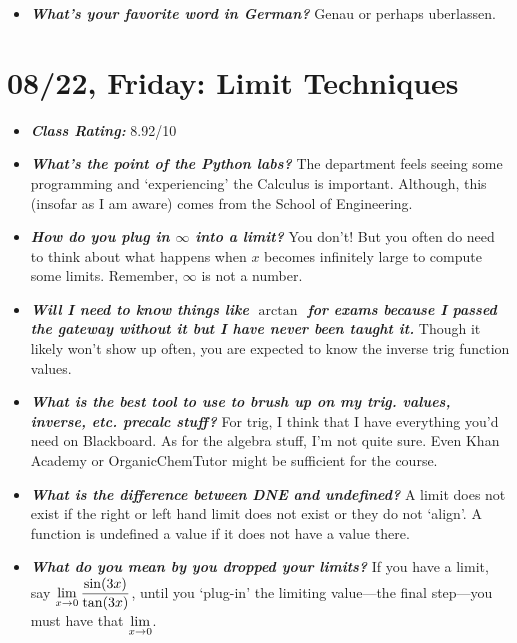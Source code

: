 \documentclass[11pt,letterpaper]{article}
\begin{document}
\begin{itemize}
\item {\bfseries\itshape What's your favorite word in German?} Genau or perhaps uberlassen.
\end{itemize}

\newpage
\section*{08/22, Friday: Limit Techniques\label{08-22}}

\begin{itemize}
\item {\bfseries\itshape Class Rating:} 8.92/10

\item {\bfseries\itshape What's the point of the Python labs?} The department feels seeing some programming and `experiencing' the Calculus is important. Although, this (insofar as I am aware) comes from the School of Engineering. 

\item {\bfseries\itshape How do you plug in $\infty$ into a limit?} You don't! But you often do need to think about what happens when $x$ becomes infinitely large to compute some limits. Remember, $\infty$ is not a number. 

\item {\bfseries\itshape Will I need to know things like $\arctan$ for exams because I passed the gateway without it but I have never been taught it.} Though it likely won't show up often, you are expected to know the inverse trig function values. 

\item {\bfseries\itshape What is the best tool to use to brush up on my trig. values, inverse, etc. precalc stuff?} For trig, I think that I have everything you'd need on Blackboard. As for the algebra stuff, I'm not quite sure. Even Khan Academy or OrganicChemTutor might be sufficient for the course. 

\item {\bfseries\itshape What is the difference between DNE and undefined?} A limit does not exist if the right or left hand limit does not exist or they do not `align'. A function is undefined a value if it does not have a value there. 

\item {\bfseries\itshape What do you mean by you dropped your limits?} If you have a limit, say $\displaystyle\lim_{x \to 0} \dfrac{\sin(3x)}{\tan(3x)}$, until you `plug-in' the limiting value---the final step---you must have that $\displaystyle\lim_{x \to 0}$.


\end{itemize}
\end{document}
